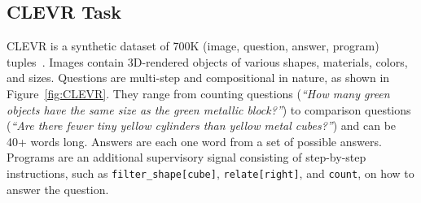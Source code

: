 \documentclass[letterpaper]{article} \usepackage{aaai18}  \usepackage{times}  \usepackage{helvet}  \usepackage{courier}  \usepackage{url}  \usepackage{graphicx}  \frenchspacing  \setlength{\pdfpagewidth}{8.5in}  \setlength{\pdfpageheight}{11in}
\begin{document}
	\subsection{CLEVR Task} \label{CLEVR}
    	CLEVR is a synthetic dataset of 700K (image, question, answer, program) tuples~\cite{CLEVR}. Images contain 3D-rendered objects of various shapes, materials, colors, and sizes. Questions are multi-step and compositional in nature, as shown in Figure~\ref{fig:CLEVR}. They range from counting questions (\textit{``How many green objects have the same size as the green metallic block?''}) to comparison questions (\textit{``Are there fewer tiny yellow cylinders than yellow metal cubes?''}) and can be 40+ words long. Answers are each one word from a set of  possible answers. Programs are an additional supervisory signal consisting of step-by-step instructions, such as \texttt{filter\_shape[cube]}, \texttt{relate[right]}, and \texttt{count}, on how to answer the question.
        
\end{document}
